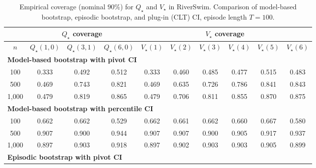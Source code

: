 \documentclass{article}
\numberwithin{equation}{section}
\begin{document}
\begin{table}[ht]
\centering
\caption{Empirical coverage (nominal $90\%$) for $Q_\star$ and $V_\star$ in RiverSwim. Comparison of model-based bootstrap, episodic bootstrap, and plug-in (CLT) CI, episode length $T=100$.}
\label{tab:riverswim-optimal-coverage-T100-90}
\begin{tabular}{c|ccc|cccccc}
\hline
& \multicolumn{3}{c|}{$Q_\star$ coverage} & \multicolumn{6}{c}{$V_\star$ coverage} \\ \hline
$n$
& $Q_\star(1,0)$ & $Q_\star(3,1)$ & $Q_\star(6,0)$
& $V_\star(1)$ & $V_\star(2)$ & $V_\star(3)$ & $V_\star(4)$ & $V_\star(5)$ & $V_\star(6)$ \\
\hline
\multicolumn{10}{l}{\textbf{Model-based bootstrap with pivot CI}} \\ \hline
100
& 0.333 & 0.492 & 0.512
& 0.333 & 0.460 & 0.485 & 0.477 & 0.515 & 0.483 \\
500
& 0.469 & \cellcolor{covheat!22!white}0.743 & \cellcolor{covheat!60!white}0.821
& 0.469 & 0.635 & \cellcolor{covheat!13!white}0.726 & \cellcolor{covheat!43!white}0.786 & \cellcolor{covheat!70!white}0.841 & \cellcolor{covheat!71!white}0.843 \\
1{,}000
& 0.479 & \cellcolor{covheat!59!white}0.819 & \cellcolor{covheat!82!white}0.865
& 0.479 & \cellcolor{covheat!3!white}0.706 & \cellcolor{covheat!56!white}0.811 & \cellcolor{covheat!77!white}0.855 & \cellcolor{covheat!85!white}0.870 & \cellcolor{covheat!87!white}0.875 \\
\hline
\multicolumn{10}{l}{\textbf{Model-based bootstrap with percentile CI}} \\ \hline
100
& 0.662 & 0.662 & 0.529
& 0.662 & 0.661 & 0.662 & 0.660 & 0.667 & 0.580 \\
500
& \cellcolor{covheat!100!white}0.907 & \cellcolor{covheat!100!white}0.900 & \cellcolor{covheat!100!white}0.944
& \cellcolor{covheat!100!white}0.907 & \cellcolor{covheat!100!white}0.907 & \cellcolor{covheat!100!white}0.900 & \cellcolor{covheat!100!white}0.905 & \cellcolor{covheat!100!white}0.917 & \cellcolor{covheat!100!white}0.937 \\
1{,}000
& \cellcolor{covheat!98!white}0.897 & \cellcolor{covheat!100!white}0.903 & \cellcolor{covheat!100!white}0.918
& \cellcolor{covheat!98!white}0.897 & \cellcolor{covheat!100!white}0.902 & \cellcolor{covheat!100!white}0.903 & \cellcolor{covheat!100!white}0.903 & \cellcolor{covheat!100!white}0.905 & \cellcolor{covheat!100!white}0.899 \\
\hline
\multicolumn{10}{l}{\textbf{Episodic bootstrap with pivot CI}} \\ \hline

\end{tabular}
\end{table}
\end{document}
